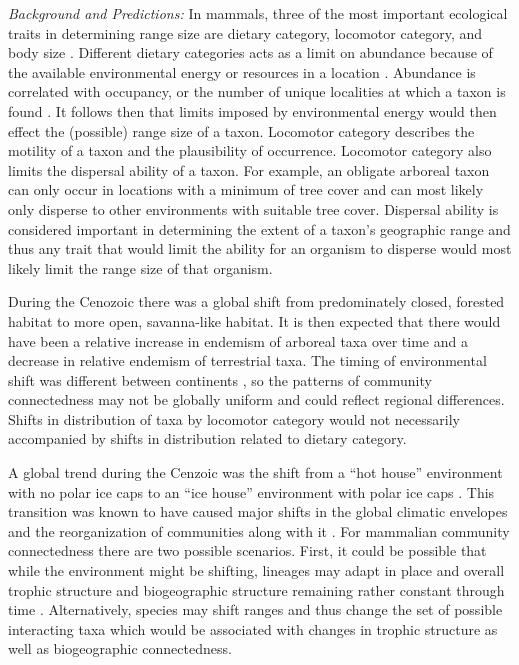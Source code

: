 \documentclass[12pt,letterpaper]{article}
\begin{document}
\textit{Background and Predictions:}
In mammals, three of the most important ecological traits in determining range size are dietary category, locomotor category, and body size \citep{Jernvall2004,Smith2008b,Smith2004,Lyons2005,Lyons2010}. Different dietary categories acts as a limit on abundance because of the available environmental energy or resources in a location \citep{VanValen1989,Brown1987,Damuth1979,Silva1997,Janis2000}. Abundance is correlated with occupancy, or the number of unique localities at which a taxon is found \citep{Jernvall2002,Fortelius2002,Brown1984}. It follows then that limits imposed by environmental energy would then effect the (possible) range size of a taxon. Locomotor category describes the motility of a taxon and the plausibility of occurrence. Locomotor category also limits the dispersal ability of a taxon. For example, an obligate arboreal taxon can only occur in locations with a minimum of tree cover and can most likely only disperse to other environments with suitable tree cover. Dispersal ability is considered important in determining the extent of a taxon's geographic range \citep{Birand2012,Jablonski2006a,Gaston2009} and thus any trait that would limit the ability for an organism to disperse would most likely limit the range size of that organism.

During the Cenozoic there was a global shift from predominately closed, forested habitat to more open, savanna-like habitat. It is then expected that there would have been a relative increase in endemism of arboreal taxa over time and a decrease in relative endemism of terrestrial taxa. The timing of environmental shift was different between continents \citep{Stromberg2005,Stromberg2013}, so the patterns of community connectedness may not be globally uniform and could reflect regional differences. Shifts in distribution of taxa by locomotor category would not necessarily accompanied by shifts in distribution related to dietary category.

A global trend during the Cenzoic was the shift from a ``hot house'' environment with no polar ice caps to an ``ice house'' environment with polar ice caps \citep{Zachos2008,Zachos2001}. This transition was known to have caused major shifts in the global climatic envelopes and the reorganization of communities along with it \citep{Janis1993a,Fortelius2002,Blois2009,Alroy2000g,Figueirido2012}. For mammalian community connectedness there are two possible scenarios. First, it could be possible that while the environment might be shifting, lineages may adapt in place and overall trophic structure and biogeographic structure remaining rather constant through time \citep{Jernvall2004}. Alternatively, species may shift ranges and thus change the set of possible interacting taxa which would be associated with changes in trophic structure as well as biogeographic connectedness.
\end{document}
